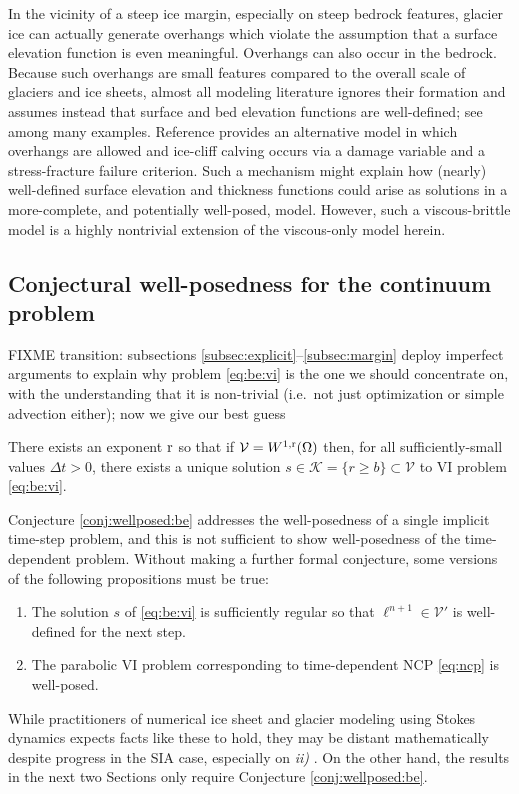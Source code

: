 \documentclass[hidelinks,onefignum,onetabnum,final]{siamart220329}  %
\newcommand{\cK}{\mathcal{K}}
\newcommand{\cV}{\mathcal{V}}
\newcommand{\rr}{{\text{\textnormal{r}}}}
\begin{document}
In the vicinity of a steep ice margin, especially on steep bedrock features, glacier ice can actually generate overhangs which violate the assumption that a surface elevation function is even meaningful.  Overhangs can also occur in the bedrock.  Because such overhangs are small features compared to the overall scale of glaciers and ice sheets, almost all modeling literature ignores their formation and assumes instead that surface and bed elevation functions are well-defined; see \cite{IsaacStadlerGhattas2015,Jouvetetal2008,LofgrenAhlkronaHelanow2022,WirbelJarosch2020} among many examples.  Reference \cite{PralongFunk2005} provides an alternative model in which overhangs are allowed and ice-cliff calving occurs via a damage variable and a stress-fracture failure criterion.  Such a mechanism might explain how (nearly) well-defined surface elevation and thickness functions could arise as solutions in a more-complete, and potentially well-posed, model.  However, such a viscous-brittle model is a highly nontrivial extension of the viscous-only model herein.

\subsection{Conjectural well-posedness for the continuum problem} \label{subsec:conjecture} FIXME transition: subsections \ref{subsec:explicit}--\ref{subsec:margin} deploy imperfect arguments to explain why problem \eqref{eq:be:vi} is the one we should concentrate on, with the understanding that it is non-trivial (i.e.~not just optimization or simple advection either); now we give our best guess

\begin{conjecture} \label{conj:wellposed:be}
There exists an exponent $\rr$ so that if $\cV = W^{1,\rr}(\Omega)$ then, for all sufficiently-small values $\Delta t>0$, there exists a unique solution $s \in \cK = \{r\ge b\} \subset \cV$ to VI problem \eqref{eq:be:vi}.
\end{conjecture}

Conjecture \ref{conj:wellposed:be} addresses the well-posedness of a single implicit time-step problem, and this is not sufficient to show well-posedness of the time-dependent problem.  Without making a further formal conjecture, some versions of the following propositions must be true:
\renewcommand{\labelenumi}{\emph{\roman{enumi})}}
\begin{enumerate}
\item The solution $s$ of \eqref{eq:be:vi} is sufficiently regular so that $\ell^{n+1} \in \cV'$ is well-defined for the next step.
\item The parabolic VI problem \cite{Glowinski1984} corresponding to time-dependent NCP \eqref{eq:ncp} is well-posed.
\end{enumerate}
While practitioners of numerical ice sheet and glacier modeling using Stokes dynamics expects facts like these to hold, they may be distant mathematically despite progress in the SIA case, especially on \emph{ii)} \cite{Calvoetal2003,PiersantiTemam2023}.  On the other hand, the results in the next two Sections only require Conjecture \ref{conj:wellposed:be}.
\end{document}
